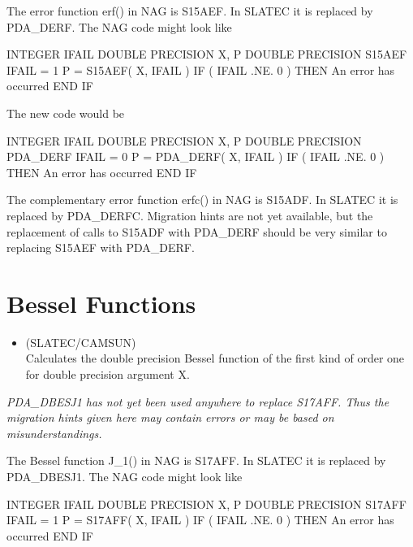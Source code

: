 \documentclass[11pt,twoside,nolof]{starlink}
\begin{document}
   The error function erf() in NAG is S15AEF. In SLATEC it is replaced
   by PDA\_DERF. The NAG code might look like

\begin{terminalv}
      INTEGER IFAIL
      DOUBLE PRECISION X, P
      DOUBLE PRECISION S15AEF
      IFAIL = 1
      P = S15AEF( X, IFAIL )
      IF ( IFAIL .NE. 0 ) THEN
         An error has occurred
      END IF
\end{terminalv}

   The new code would be

\begin{terminalv}
      INTEGER IFAIL
      DOUBLE PRECISION X, P
      DOUBLE PRECISION PDA_DERF
      IFAIL = 0
      P = PDA_DERF( X, IFAIL )
      IF ( IFAIL .NE. 0 ) THEN
         An error has occurred
      END IF
\end{terminalv}

   The complementary error function erfc() in NAG is S15ADF. In SLATEC
   it is replaced by PDA\_DERFC. Migration hints are not yet available,
   but the replacement of calls to S15ADF with PDA\_DERF should be very
   similar to replacing S15AEF with PDA\_DERF.


\section{Bessel Functions}

\begin{itemize}

\item {} (SLATEC/CAMSUN)\\
   Calculates the double precision Bessel function of the first kind
   of order one for double precision argument X.

\end{itemize}

\emph{PDA\_DBESJ1 has not yet been used anywhere to replace S17AFF. Thus the
   migration hints given here may contain errors or may be based on
   misunderstandings.}

   The Bessel function J\_1() in NAG is S17AFF. In SLATEC it is replaced
   by PDA\_DBESJ1. The NAG code might look like

\begin{terminalv}
      INTEGER IFAIL
      DOUBLE PRECISION X, P
      DOUBLE PRECISION S17AFF
      IFAIL = 1
      P = S17AFF( X, IFAIL )
      IF ( IFAIL .NE. 0 ) THEN
         An error has occurred
      END IF
\end{terminalv}
\end{document}
